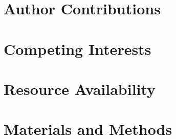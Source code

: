 \documentclass[11pt]{elife}
\begin{document}
\begin{fullwidth}
\section{Author Contributions}




\section{Competing Interests}




\section{Resource Availability}




\section{Materials and Methods} %




%
%


\end{fullwidth}
\end{document}
